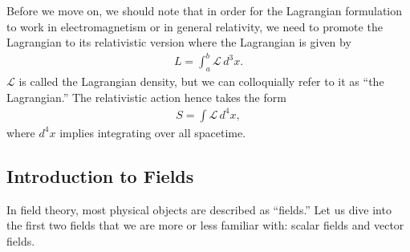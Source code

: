 \documentclass[a4paper,11pt]{article}
\numberwithin{equation}{section}
\theoremstyle{definition}
\begin{document}
Before we move on, we should note that in order for the Lagrangian formulation to work in electromagnetism or in general relativity, we need to promote the Lagrangian to its relativistic version where the Lagrangian is given by
\begin{align*}
L = \int_a^b\mathcal{L}\,d^3x.
\end{align*}
$\mathcal{L}$ is called the Lagrangian density, but we can colloquially refer to it as ``the Lagrangian.'' The relativistic action hence takes the form
\begin{align*}
S = \int \mathcal{L}\,d^4x,
\end{align*}
where $d^4x$ implies integrating over all spacetime.

\subsection{Introduction to Fields}
In field theory, most physical objects are described as ``fields.'' Let us dive into the first two fields that we are more or less familiar with: scalar fields and vector fields. 
\end{document}
